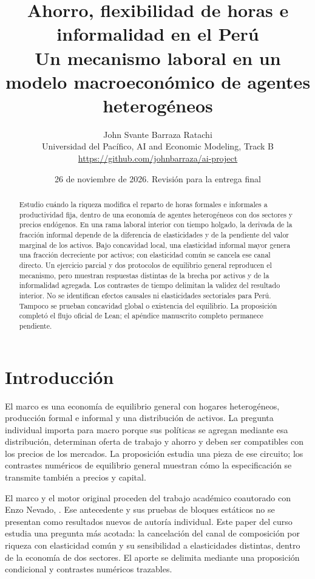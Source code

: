 \documentclass[11pt]{article}
\title{Ahorro, flexibilidad de horas e informalidad en el Perú\\[3pt]\large Un mecanismo laboral en un modelo macroeconómico de agentes heterogéneos}
\author{John Svante Barraza Ratachi\\ \small Universidad del Pacífico, AI and Economic Modeling, Track B\\
\small\url{https://github.com/johnbarraza/ai-project}}
\date{26 de noviembre de 2026. Revisión para la entrega final}
\theoremstyle{definition}
\begin{document}
\maketitle
\begin{abstract}
Estudio cuándo la riqueza modifica el reparto de horas formales e informales a productividad fija, dentro de una economía de agentes heterogéneos con dos sectores y precios endógenos. En una rama laboral interior con tiempo holgado, la derivada de la fracción informal depende de la diferencia de elasticidades y de la pendiente del valor marginal de los activos. Bajo concavidad local, una elasticidad informal mayor genera una fracción decreciente por activos; con elasticidad común se cancela ese canal directo. Un ejercicio parcial y dos protocolos de equilibrio general reproducen el mecanismo, pero muestran respuestas distintas de la brecha por activos y de la informalidad agregada. Los contrastes de tiempo delimitan la validez del resultado interior. No se identifican efectos causales ni elasticidades sectoriales para Perú. Tampoco se prueban concavidad global o existencia del equilibrio. La proposición completó el flujo oficial de Lean; el apéndice manuscrito completo permanece pendiente.
\end{abstract}

\section{Introducción}
El marco es una economía de equilibrio general con hogares heterogéneos, producción formal e informal y una distribución de activos. La pregunta individual importa para macro porque sus políticas se agregan mediante esa distribución, determinan oferta de trabajo y ahorro y deben ser compatibles con los precios de los mercados. La proposición estudia una pieza de ese circuito; los contrastes numéricos de equilibrio general muestran cómo la especificación se transmite también a precios y capital.

El marco y el motor original proceden del trabajo académico coautorado con Enzo Nevado, \citet{BarrazaNevado2026}. Ese antecedente y sus pruebas de bloques estáticos no se presentan como resultados nuevos de autoría individual. Este paper del curso estudia una pregunta más acotada: la cancelación del canal de composición por riqueza con elasticidad común y su sensibilidad a elasticidades distintas, dentro de la economía de dos sectores. El aporte se delimita mediante una proposición condicional y contrastes numéricos trazables.
\end{document}

